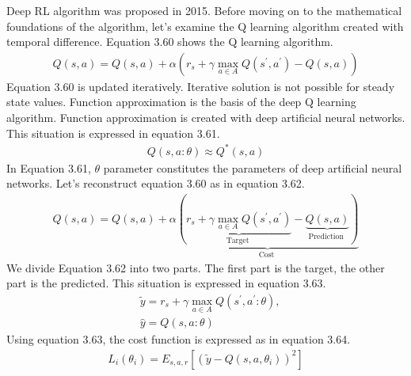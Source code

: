 \documentclass[12pt,twoside,a4]{mwbk}
\begin{document}
\noindent Deep RL algorithm was proposed in 2015. Before moving on to the mathematical foundations of the algorithm, let's examine the Q learning algorithm created with temporal difference. Equation 3.60 shows the Q learning algorithm.
\begin{subequations}
\begin{align}
    Q(s, a)=Q(s, a)+\alpha(r_s +\gamma \max _{a \in A} Q\left(s^{\prime}, a^{\prime}\right)-Q(s, a))
\end{align}
\end{subequations}
Equation 3.60 is updated iteratively. Iterative solution is not possible for steady state values. Function approximation is the basis of the deep Q learning algorithm. Function approximation is created with deep artificial neural networks. This situation is expressed in equation 3.61.
\begin{subequations}
\begin{align}
    Q(s, a: \theta) \approx Q^{*}(s, a)
\end{align}
\end{subequations}
In Equation 3.61, $\theta$ parameter constitutes the parameters of deep artificial neural networks. Let's reconstruct equation 3.60 as in equation 3.62.
\begin{subequations}
\begin{align}
    Q(s, a)=Q(s, a)+\alpha \underbrace{(\underbrace{r_{s}+\gamma \max _{a \in A} Q\left(s^{\prime}, a^{\prime}\right)}_{\text {Target }}-\underbrace{Q(s, a)}_{\text {Prediction }})}_{\text {Cost }}
\end{align}
\end{subequations}
We divide Equation 3.62 into two parts. The first part is the target, the other part is the predicted. This situation is expressed in equation 3.63.
\begin{subequations}
\begin{align}
    &\tilde{y}=r_{s}+\gamma \max _{a \in A} Q\left(s^{\prime}, a^{\prime}: \theta\right), \\
&\hat{y}=Q(s, a: \theta)
\end{align}
\end{subequations}
Using equation 3.63, the cost function is expressed as in equation 3.64.
\begin{subequations}
\begin{align}
    L_{i}\left(\theta_{i}\right)=E_{s, a, r}\left[\left(\tilde{y}-Q\left(s, a, \theta_{i}\right)\right)^{2}\right]
\end{align}
\end{subequations}
\end{document}
